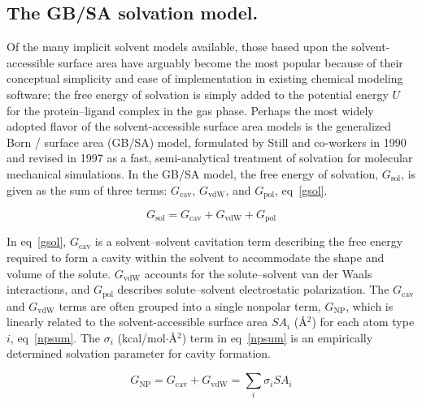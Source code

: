 \documentclass[12pt]{report}
\def\equlab{eq}\def\equslab{Eqs.}
\newcommand*\eq[1]{\equlab~\ref{#1}}
\begin{document}

\subsection{The GB/SA solvation model.}
 
Of the many implicit solvent models available, those based upon the solvent-accessible surface area have arguably become the most popular because of their conceptual simplicity and ease of implementation in existing chemical modeling software; the free energy of solvation is simply added to the potential energy $U$ for the protein--ligand complex in the gas phase. Perhaps the most widely adopted flavor of the solvent-accessible surface area models is the generalized Born / surface area (GB/SA) model, formulated by Still and co-workers\cite{still} in 1990 and revised\cite{qiu} in 1997 as a fast, semi-analytical treatment of solvation for molecular mechanical simulations. In the GB/SA model, the free energy of solvation, $G_{\textrm{sol}}$, is given as the sum of three terms: $G_{\textrm{cav}}$, $G_{\textrm{vdW}}$, and $G_{\textrm{pol}}$, \eq{gsol}.

\vspace*{-0.4cm}
\begin{equation}
\label{gsol}
G_{\textrm{sol}} = G_{\textrm{cav}} + G_{\textrm{vdW}} + G_{\textrm{pol}}
\end{equation}
\vspace*{-0.8cm}

In \eq{gsol}, $G_{\textrm{cav}}$ is a solvent--solvent cavitation term describing the free energy required to form a cavity within the solvent to accommodate the shape and volume of the solute. $G_{\textrm{vdW}}$ accounts for the solute--solvent van der Waals interactions, and $G_{\textrm{pol}}$ describes solute--solvent electrostatic polarization. The $G_{\textrm{cav}}$ and $G_{\textrm{vdW}}$ terms are often grouped into a single nonpolar term, $G_{\textrm{NP}}$, which is linearly related \cite{hermann} to the solvent-accessible surface area $SA_{i}$ (\AA$^{2}$) for each atom type $i$, \eq{npsum}. The $\sigma_{i}$ (kcal/mol$\cdot$\AA$^{2}$) term in \eq{npsum} is an empirically determined solvation parameter for cavity formation.

\vspace*{-0.4cm}
\begin{equation}
\label{npsum}
G_{\textrm{NP}} = G_{\textrm{cav}} + G_{\textrm{vdW}} = \sum_{i}{\sigma_{i} SA_{i}}
\end{equation}
\vspace*{-0.8cm}
\end{document}
